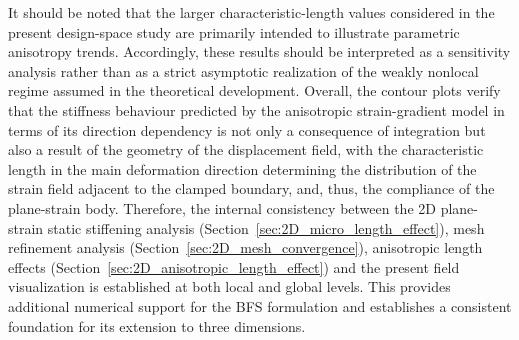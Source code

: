 \documentclass[final,3p,times,fleqn]{elsarticle}
\begin{document}
It should be noted that the larger characteristic-length values considered
in the present design-space study are primarily intended to illustrate
parametric anisotropy trends. Accordingly, these results should be
interpreted as a sensitivity analysis rather than as a strict asymptotic
realization of the weakly nonlocal regime assumed in the theoretical
development. Overall, the contour plots verify that the stiffness behaviour
predicted by the anisotropic strain-gradient model in terms of its
direction dependency is not only a consequence of integration but also
a result of the geometry of the displacement field, with the
characteristic length in the main deformation direction determining
the distribution of the strain field adjacent to the clamped
boundary, and, thus, the compliance of the plane-strain body.
Therefore, the internal consistency between the 2D plane-strain
static stiffening analysis (Section~\ref{sec:2D_micro_length_effect}),
mesh refinement analysis (Section~\ref{sec:2D_mesh_convergence}),
anisotropic length effects (Section~\ref{sec:2D_anisotropic_length_effect})
and the present field visualization is established at both local and
global levels.
This provides additional numerical support for the BFS formulation and
establishes a consistent foundation for its extension to three dimensions.


%
%
%
\end{document}
